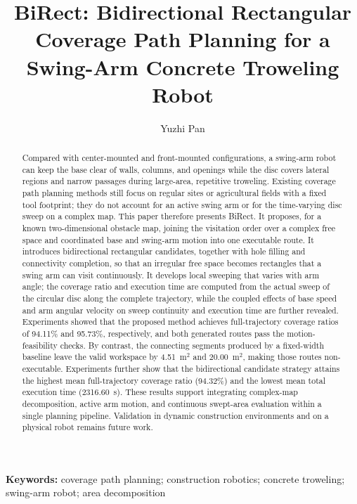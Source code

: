 \documentclass[a4paper,11pt]{article}
\title{BiRect: Bidirectional Rectangular Coverage Path Planning for a Swing-Arm Concrete Troweling Robot}
\author{Yuzhi Pan}
\date{}
\begin{document}
\maketitle

\begin{abstract}
Compared with center-mounted and front-mounted configurations, a swing-arm robot can keep the base clear of walls, columns, and openings while the disc covers lateral regions and narrow passages during large-area, repetitive troweling. Existing coverage path planning methods still focus on regular sites or agricultural fields with a fixed tool footprint; they do not account for an active swing arm or for the time-varying disc sweep on a complex map. This paper therefore presents BiRect. It proposes, for a known two-dimensional obstacle map, joining the visitation order over a complex free space and coordinated base and swing-arm motion into one executable route. It introduces bidirectional rectangular candidates, together with hole filling and connectivity completion, so that an irregular free space becomes rectangles that a swing arm can visit continuously. It develops local sweeping that varies with arm angle; the coverage ratio and execution time are computed from the actual sweep of the circular disc along the complete trajectory, while the coupled effects of base speed and arm angular velocity on sweep continuity and execution time are further revealed. Experiments showed that the proposed method achieves full-trajectory coverage ratios of 94.11\% and 95.73\%, respectively, and both generated routes pass the motion-feasibility checks. By contrast, the connecting segments produced by a fixed-width baseline leave the valid workspace by 4.51~m$^2$ and 20.00~m$^2$, making those routes non-executable. Experiments further show that the bidirectional candidate strategy attains the highest mean full-trajectory coverage ratio (94.32\%) and the lowest mean total execution time (2316.60~s). These results support integrating complex-map decomposition, active arm motion, and continuous swept-area evaluation within a single planning pipeline. Validation in dynamic construction environments and on a physical robot remains future work.
\end{abstract}

\noindent\textbf{Keywords:} coverage path planning; construction robotics; concrete troweling; swing-arm robot; area decomposition






\nocite{*}

\begingroup
\small

\endgroup
\end{document}
